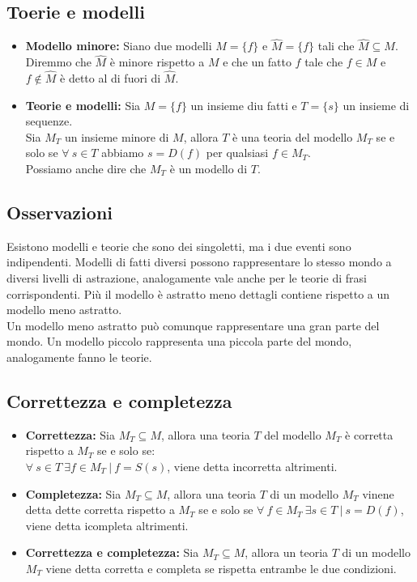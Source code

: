 \documentclass[../main.tex]{subfiles}
\newcommand{\spazio}{\vspace{1em} \newline}
\begin{document}
    \subsection{Toerie e modelli}
    \begin{itemize}
        \item \textbf{Modello minore:} Siano due modelli $M=\{f\}$ e $\widehat{M}=\{f\}$ tali che $\widehat{M}\subseteq M$.\\
            Diremmo che $\widehat{M}$ è minore rispetto a $M$ e che un fatto $f$ tale che $f \in M$ e $f \notin \widehat{M}$ è detto al di fuori di $\widehat{M}$.
        \item \textbf{Teorie e modelli:} Sia $M=\{f\}$ un insieme diu fatti e $T=\{s\}$ un insieme di sequenze.\\
            Sia $M_T$ un insieme minore di $M$, allora $T$ è una teoria del modello $M_T$ se e solo se $\forall\ s\in T$ abbiamo $s=D(f) $ per qualsiasi $f \in M_T$.\\
            Possiamo anche dire che $M_T$ è un modello di $T$. 
    \end{itemize}

    \subsection{Osservazioni}
    Esistono modelli e teorie che sono dei singoletti, ma i due eventi sono indipendenti.
    \spazio
    Modelli di fatti diversi possono rappresentare lo stesso mondo a diversi livelli di astrazione, analogamente vale anche per le teorie di frasi corrispondenti.
    \spazio
    Più il modello è astratto meno dettagli contiene rispetto a un modello meno astratto.\\
    Un modello meno astratto può comunque rappresentare una gran parte del mondo.
    \spazio
    Un modello piccolo rappresenta una piccola parte del mondo, analogamente fanno le teorie.

    \subsection{Correttezza e completezza}
    \begin{itemize}
        \item \textbf{Correttezza:} Sia $M_T \subseteq M$, allora una teoria $T$ del modello $M_T$ è corretta rispetto a $M_T$ se e solo se:\\
            $\forall\ s \in T\ \exists f \in M_T\ |\ f=S(s)$, viene detta incorretta altrimenti.
        \item \textbf{Completezza:} Sia $M_T \subseteq M$, allora una teoria $T$ di un modello $M_T$ vinene detta dette corretta rispetto a $M_T$ se e solo se $\forall\ f \in M_T\ \exists s \in T\ |\ s=D(f)$, viene detta icompleta altrimenti.
        \item \textbf{Correttezza e completezza:} Sia $M_T \subseteq M$, allora un teoria $T$ di un modello $M_T$ viene detta corretta e completa se rispetta entrambe le due condizioni.
    \end{itemize}
\end{document}

